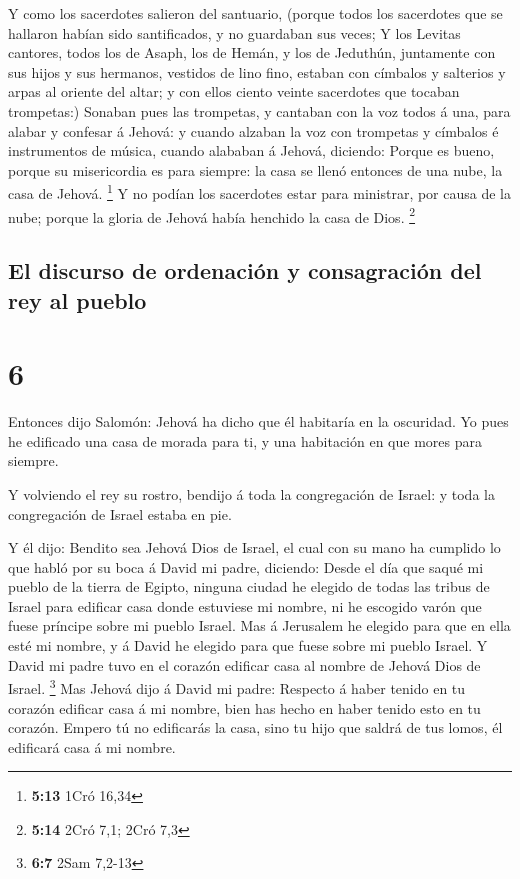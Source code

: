  Y como los sacerdotes salieron del santuario, (porque
todos los sacerdotes que se hallaron habían sido santificados, y no
guardaban sus veces;  Y los Levitas cantores, todos los
de Asaph, los de Hemán, y los de Jeduthún, juntamente con sus hijos y
sus hermanos, vestidos de lino fino, estaban con címbalos y salterios y
arpas al oriente del altar; y con ellos ciento veinte sacerdotes que
tocaban trompetas:)  Sonaban pues las trompetas, y
cantaban con la voz todos á una, para alabar y confesar á Jehová: y
cuando alzaban la voz con trompetas y címbalos é instrumentos de música,
cuando alababan á Jehová, diciendo: Porque es bueno, porque su
misericordia es para siempre: la casa se llenó entonces de una nube, la
casa de Jehová. \footnote{\textbf{5:13} 1Cró 16,34}  Y no
podían los sacerdotes estar para ministrar, por causa de la nube; porque
la gloria de Jehová había henchido la casa de Dios. \footnote{\textbf{5:14}
  2Cró 7,1; 2Cró 7,3}

\hypertarget{el-discurso-de-ordenaciuxf3n-y-consagraciuxf3n-del-rey-al-pueblo}{%
\subsection{El discurso de ordenación y consagración del rey al
pueblo}\label{el-discurso-de-ordenaciuxf3n-y-consagraciuxf3n-del-rey-al-pueblo}}

\hypertarget{section-5}{%
\section{6}\label{section-5}}

 Entonces dijo Salomón: Jehová ha dicho que él habitaría
en la oscuridad.  Yo pues he edificado una casa de morada
para ti, y una habitación en que mores para siempre.

 Y volviendo el rey su rostro, bendijo á toda la
congregación de Israel: y toda la congregación de Israel estaba en pie.

 Y él dijo: Bendito sea Jehová Dios de Israel, el cual con
su mano ha cumplido lo que habló por su boca á David mi padre, diciendo:
 Desde el día que saqué mi pueblo de la tierra de Egipto,
ninguna ciudad he elegido de todas las tribus de Israel para edificar
casa donde estuviese mi nombre, ni he escogido varón que fuese príncipe
sobre mi pueblo Israel.  Mas á Jerusalem he elegido para
que en ella esté mi nombre, y á David he elegido para que fuese sobre mi
pueblo Israel.  Y David mi padre tuvo en el corazón
edificar casa al nombre de Jehová Dios de Israel. \footnote{\textbf{6:7}
  2Sam 7,2-13}  Mas Jehová dijo á David mi padre: Respecto
á haber tenido en tu corazón edificar casa á mi nombre, bien has hecho
en haber tenido esto en tu corazón.  Empero tú no
edificarás la casa, sino tu hijo que saldrá de tus lomos, él edificará
casa á mi nombre.

